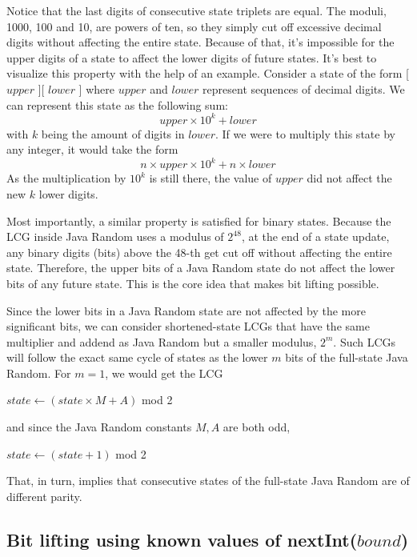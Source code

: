\documentclass{article}
\begin{document}
Notice that the last digits of consecutive state triplets are equal. The moduli, 1000, 100 and 10, are powers of ten, so they simply cut off excessive decimal digits without affecting the entire state. Because of that, it’s impossible for the upper digits of a state to affect the lower digits of future states. It’s best to visualize this property with the help of an example. Consider a state of the form [ $upper$ ][ $lower$ ] where $upper$ and $lower$ represent sequences of decimal digits. We can represent this state as the following sum:
\begin{equation}
    upper \times 10^k + lower
\end{equation}
\noindent with $k$ being the amount of digits in $lower$. If we were to multiply this state by any integer, it would take the form
\begin{equation}
    n \times upper \times 10^k + n \times lower
\end{equation}
\noindent As the multiplication by $10^k$ is still there, the value of $upper$ did not affect the new $k$ lower digits.

Most importantly, a similar property is satisfied for binary states. Because the LCG inside Java Random uses a modulus of $2^{48}$, at the end of a state update, any binary digits (bits) above the 48-th get cut off without affecting the entire state. Therefore, the upper bits of a Java Random state do not affect the lower bits of any future state. This is the core idea that makes bit lifting possible.

Since the lower bits in a Java Random state are not affected by the more significant bits, we can consider shortened-state LCGs that have the same multiplier and addend as Java Random but a smaller modulus, $2^m$. Such LCGs will follow the exact same cycle of states as the lower $m$ bits of the full-state Java Random. For $m = 1$, we would get the LCG
\begin{algorithmic}
    \State $state \gets (state \times M + A)$ mod 2
\end{algorithmic}
\noindent and since the Java Random constants $M, A$ are both odd,
\begin{algorithmic}
    \State $state \gets (state + 1)$ mod 2
\end{algorithmic}
\noindent That, in turn, implies that consecutive states of the full-state Java Random are of different parity.

\subsection{ Bit lifting using known values of nextInt($bound$) }
\end{document}
